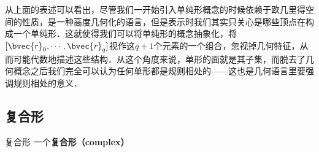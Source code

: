 从上面的表述可以看出，尽管我们一开始引入单纯形概念的时候依赖于欧几里得空间的性质，是一种高度几何化的语言，但是表示时我们其实只关心是哪些顶点在构成一个单纯形．这就使得我们可以将单纯形的概念抽象化，将$[\bvec{r}_0, \cdots, \bvec{r}_q]$视作这$q+1$个元素的一个组合，忽视掉几何特征，从而可能代数地描述这些结构．从这个角度来说，单形的面就是其子集，而脱去了几何概念之后我们完全可以认为任何单形都是规则相处的——这也是几何语言里要强调规则相处的意义．

\subsection{复合形}

\begin{definition}{复合形}
一个\textbf{复合形（complex）}
\end{definition}










